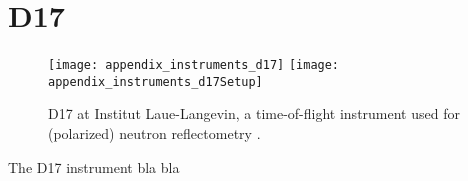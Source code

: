 \documentclass[\main/dresen_thesis.tex]{subfiles}
\begin{document}
\section{D17}\label{ch:appendix:lss:d17}

\begin{figure}[h]
  \centering
  \texttt{[image: appendix\_instruments\_d17]}
  \texttt{[image: appendix\_instruments\_d17Setup]}
  \caption{\label{fig:appendix:lss:d17}D17 at Institut Laue-Langevin, a time-of-flight instrument used for (polarized) neutron reflectometry \cite{Saerbeck_2018_Recen}.}
\end{figure}
The D17 instrument bla bla
\end{document}
